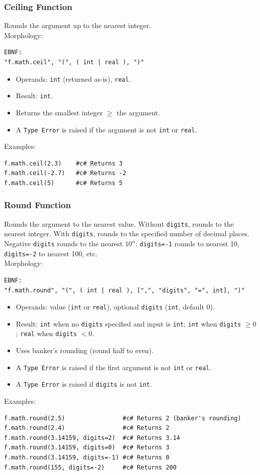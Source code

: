 \subsubsection{Ceiling Function}
Rounds the argument up to the nearest integer. \\
Morphology:
\begin{verbatim}
EBNF:
"f.math.ceil", "(", ( int | real ), ")"
\end{verbatim}
\begin{itemize}
\item Operands: \texttt{int} (returned as-is), \texttt{real}.
\item Result: \texttt{int}.
\item Returns the smallest integer $\geq$ the argument.
\item A \texttt{Type Error} is raised if the argument is not \texttt{int} or \texttt{real}.
\end{itemize}
Examples:
\begin{verbatim}
f.math.ceil(2.3)    #c# Returns 3
f.math.ceil(-2.7)   #c# Returns -2
f.math.ceil(5)      #c# Returns 5
\end{verbatim}

\subsubsection{Round Function}
Rounds the argument to the nearest value. Without \texttt{digits}, rounds to the nearest integer. With \texttt{digits}, rounds to the specified number of decimal places. Negative \texttt{digits} rounds to the nearest $10^n$: \texttt{digits=-1} rounds to nearest 10, \texttt{digits=-2} to nearest 100, etc. \\
Morphology:
\begin{verbatim}
EBNF:
"f.math.round", "(", ( int | real ), [",", "digits", "=", int], ")"
\end{verbatim}
\begin{itemize}
\item Operands: value (\texttt{int} or \texttt{real}), optional \texttt{digits} (\texttt{int}, default 0).
\item Result: \texttt{int} when no \texttt{digits} specified and input is \texttt{int}; \texttt{int} when \texttt{digits} $\geq 0$; \texttt{real} when \texttt{digits} $< 0$.
\item Uses banker's rounding (round half to even).
\item A \texttt{Type Error} is raised if the first argument is not \texttt{int} or \texttt{real}.
\item A \texttt{Type Error} is raised if \texttt{digits} is not \texttt{int}.
\end{itemize}
Examples:
\begin{verbatim}
f.math.round(2.5)                #c# Returns 2 (banker's rounding)
f.math.round(2.4)                #c# Returns 2
f.math.round(3.14159, digits=2)  #c# Returns 3.14
f.math.round(3.14159, digits=0)  #c# Returns 3
f.math.round(3.14159, digits=-1) #c# Returns 0
f.math.round(155, digits=-2)     #c# Returns 200
\end{verbatim}

